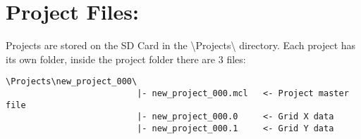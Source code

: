 \section{Project Files:}
Projects are stored on the SD Card in the \textbackslash{}Projects\textbackslash{} directory.
Each project has its own folder, inside the project folder there are 3 files:
\begin{verbatim}
\Projects\new_project_000\
                          |- new_project_000.mcl   <- Project master file
                          |- new_project_000.0     <- Grid X data
                          |- new_project_000.1     <- Grid Y data
\end{verbatim}